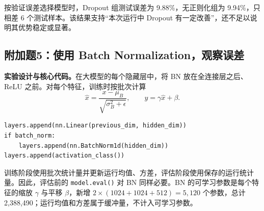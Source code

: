 \documentclass[UTF8,11pt,a4paper,fontset=fandol]{ctexart}
\newcommand{\question}[1]{\Needspace{14\baselineskip}\subsection{#1}}
\begin{document}
按验证误差选择模型时，Dropout 组测试误差为 9.88\%，无正则化组为 9.94\%，只相差 6 个测试样本。该结果支持“本次运行中 Dropout 有一定改善”，还不足以说明其优势稳定或显著。

\question{附加题5：使用 Batch Normalization，观察误差}
\textbf{实验设计与核心代码。}在大模型的每个隐藏层中，将 BN 放在全连接层之后、ReLU 之前。对每个特征，训练时按批次计算
\begin{equation}
\hat{x}=\frac{x-\mu_B}{\sqrt{\sigma_B^2+\epsilon}},\qquad
y=\gamma\hat{x}+\beta.
\end{equation}
\par\noindent\begin{minipage}{\linewidth}
\begin{lstlisting}
layers.append(nn.Linear(previous_dim, hidden_dim))
if batch_norm:
    layers.append(nn.BatchNorm1d(hidden_dim))
layers.append(activation_class())
\end{lstlisting}
\end{minipage}\par
训练阶段使用批次统计量并更新运行均值、方差，评估阶段使用保存的运行统计量。因此，评估前的 \texttt{model.eval()} 对 BN 同样必要。BN 的可学习参数是每个特征的缩放 $\gamma$ 与平移 $\beta$，新增 $2\times(1024+1024+512)=5,120$ 个参数，总计 2,388,490；运行均值和方差属于缓冲量，不计入可学习参数。
\end{document}
